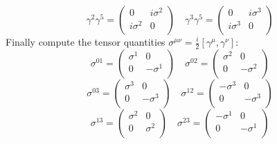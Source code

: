 \documentclass[a4paper,10pt]{article}
\begin{document}
\begin{displaymath}
\gamma^{2}\gamma^{5} = \left(\begin{array}{cc}
 0 & i\sigma^{2} \\
 i\sigma^{2} & 0 \\
 \end{array}\right)
\quad \gamma^{3}\gamma^{5} = \left(\begin{array}{cc}
 0 & i\sigma^{3} \\
 i\sigma^{3} & 0 \\
 \end{array}\right)
\end{displaymath}
Finally compute the tensor quantities $\sigma^{\mu\nu}=\frac{i}{2}\left[\gamma^{\mu},\gamma^{\nu}\right]$:
\begin{displaymath}
\sigma^{01} = \left(\begin{array}{cc}
 \sigma^{1} & 0 \\
 0 & -\sigma^{1} \\
 \end{array}\right)
\quad \sigma^{02} = \left(\begin{array}{cc}
 \sigma^{2} & 0 \\
 0 & -\sigma^{2} \\
 \end{array}\right)
\end{displaymath}
\begin{displaymath}
\sigma^{03} = \left(\begin{array}{cc}
 \sigma^{3} & 0 \\
 0 & -\sigma^{3} \\
 \end{array}\right)
\quad \sigma^{12} = \left(\begin{array}{cc}
 -\sigma^{3} & 0 \\
 0 & -\sigma^{3} \\
 \end{array}\right)
\end{displaymath}
\begin{displaymath}
\sigma^{13} = \left(\begin{array}{cc}
 \sigma^{2} & 0 \\
 0 & \sigma^{2} \\
 \end{array}\right)
\quad \sigma^{23} = \left(\begin{array}{cc}
 -\sigma^{1} & 0 \\
 0 & -\sigma^{1} \\
 \end{array}\right)
\end{displaymath}
\end{document}
